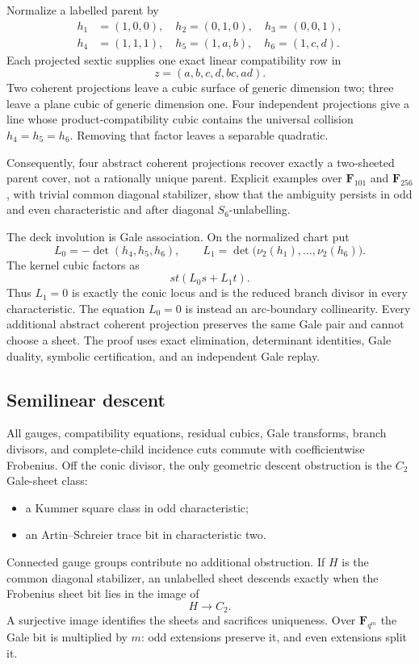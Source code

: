 \documentclass[11pt]{article}
\newcommand{\F}{\mathbf F}
\begin{document}
Normalize a labelled parent by
\[
\begin{split}
 h_1&=(1,0,0),\quad h_2=(0,1,0),\quad h_3=(0,0,1),\\
 h_4&=(1,1,1),\quad h_5=(1,a,b),\quad h_6=(1,c,d).
\end{split}
\]
Each projected sextic supplies one exact linear compatibility row in
\[
 z=(a,b,c,d,bc,ad).
\]
Two coherent projections leave a cubic surface of generic dimension two;
three leave a plane cubic of generic dimension one.  Four independent
projections give a line whose product-compatibility cubic contains the
universal collision $h_4=h_5=h_6$.  Removing that factor leaves a separable
quadratic.

Consequently, four abstract coherent projections recover exactly a
two-sheeted parent cover, not a rationally unique parent.  Explicit
examples over $\F_{101}$ and $\F_{256}$, with trivial common diagonal
stabilizer, show that the ambiguity persists in odd and even characteristic
and after diagonal $S_6$-unlabelling.

The deck involution is Gale association.  On the normalized chart put
\[
 L_0=-\det(h_4,h_5,h_6),\qquad
 L_1=\det\bigl(\nu_2(h_1),\ldots,\nu_2(h_6)\bigr).
\]
The kernel cubic factors as
\[
 st(L_0s+L_1t).
\]
Thus $L_1=0$ is exactly the conic locus and is the reduced branch divisor
in every characteristic.  The equation $L_0=0$ is instead an arc-boundary
collinearity.  Every additional abstract coherent projection preserves the
same Gale pair and cannot choose a sheet.  The proof uses exact elimination,
determinant identities, Gale duality, symbolic certification, and an
independent Gale replay.

\subsection{Semilinear descent}

All gauges, compatibility equations, residual cubics, Gale transforms,
branch divisors, and complete-child incidence cuts commute with
coefficientwise Frobenius.  Off the conic divisor, the only geometric
descent obstruction is the $C_2$ Gale-sheet class:
\begin{itemize}
\item a Kummer square class in odd characteristic;
\item an Artin--Schreier trace bit in characteristic two.
\end{itemize}
Connected gauge groups contribute no additional obstruction.  If $H$ is
the common diagonal stabilizer, an unlabelled sheet descends exactly when
the Frobenius sheet bit lies in the image of
\[
 H\longrightarrow C_2.
\]
A surjective image identifies the sheets and sacrifices uniqueness.  Over
$\F_{q^m}$ the Gale bit is multiplied by $m$: odd extensions preserve it,
and even extensions split it.
\end{document}
